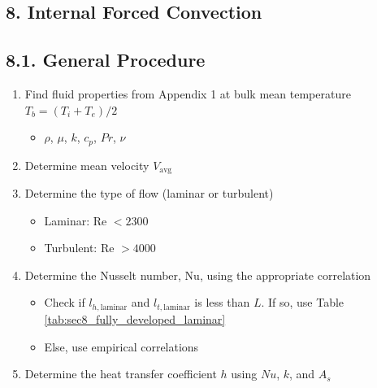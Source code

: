 \documentclass[10pt]{article}
\begin{document}
\begin{multicols*}{2}
\section*{8. Internal Forced Convection}
\subsection*{8.1. General Procedure}
\begin{enumerate}
    \item Find fluid properties from Appendix 1 at bulk mean temperature $T_b = (T_i + T_e)/2$
    \begin{itemize}
        \item $\rho$, $\mu$, $k$, $c_p$, $Pr$, $\nu$
    \end{itemize}
    \item Determine mean velocity $V_{\text{avg}}$
    \item Determine the type of flow (laminar or turbulent)
    \begin{itemize}
        \item Laminar: Re $< 2300$
        \item Turbulent: Re $> 4000$
    \end{itemize}
    \item Determine the Nusselt number, Nu, using the appropriate correlation
    \begin{itemize}
        \item Check if $l_{h, \text{laminar}}$ and $l_{t, \text{laminar}}$ is less than $L$. If so, use Table \ref{tab:sec8_fully_developed_laminar} 
        \item Else, use empirical correlations
    \end{itemize}
    \item Determine the heat transfer coefficient $h$ using $Nu$, $k$, and $A_s$
\end{enumerate}


\end{multicols*}
\end{document}

